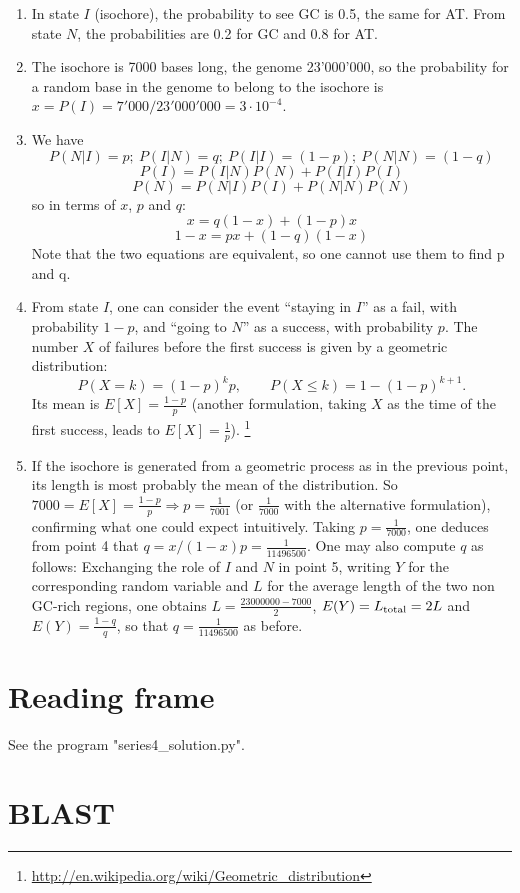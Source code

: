 \documentclass[a4paper,11pt]{article}
\begin{document}
\begin{enumerate}
\item In state $I$ (isochore), the probability to see GC is 0.5, the same for AT. From state $N$, the probabilities are 0.2 for GC and 0.8 for AT.
\item The isochore is 7000 bases long, the genome 23'000'000, so the probability for a random base in the genome to belong to the isochore is $x = P(I) = 7'000/23'000'000 = 3\cdot 10^{-4}$.
\item We have
$$ P(N|I)=p; \ P(I|N)=q; \ P(I|I)=(1-p); \ P(N|N)=(1-q)$$
$$ P(I) = P(I|N)P(N) + P(I|I)P(I) $$
$$ P(N) = P(N|I)P(I) + P(N|N)P(N) $$
so in terms of $x$, $p$ and $q$:
$$ x = q(1-x) + (1-p)x $$
$$ 1-x = px + (1-q)(1-x) $$
Note that the two equations are equivalent, so one cannot use them to find p and q.
\item From state $I$, one can consider the event ``staying in $I$'' as a fail, with probability $1-p$, and ``going to $N$'' as a success, with probability $p$. The number $X$ of failures before the first success is given by a geometric distribution:
$$ P(X=k) = (1-p)^k p, \qquad P(X\leq k) = 1-(1-p)^{k+1}. $$
Its mean is $E[X] = \frac{1-p}{p}$ (another formulation, taking $X$ as the time of the first success, leads to $E[X] = \frac{1}{p}$).
\footnote{\url{http://en.wikipedia.org/wiki/Geometric_distribution}}
\item If the isochore is generated from a geometric process as in the previous point, its length is most probably the mean of the distribution. So $7000 = E[X] = \frac{1-p}{p} \Rightarrow p = \frac{1}{7001}$ (or $\frac{1}{7000}$ with the alternative formulation), confirming what one could expect intuitively. Taking $p=\frac{1}{7000}$, one deduces from point 4 that $q = x/(1-x) p = \frac{1}{11496500}$. One may also compute $q$ as follows: Exchanging the role of $I$ and $N$ in point 5, writing $Y$ for the corresponding random variable and $L$ for the average length of the two non GC-rich regions, one obtains $L= \frac{23000000-7000}{2}$, $E(Y)=L_{\rm total}=2L$ and $E(Y) =  \frac{1-q}{q}$, so that $q = \frac{1}{11496500}$ as before.
\end{enumerate}

\section{Reading frame}

See the program "series4\_solution.py".

\section{BLAST}
\end{document}
